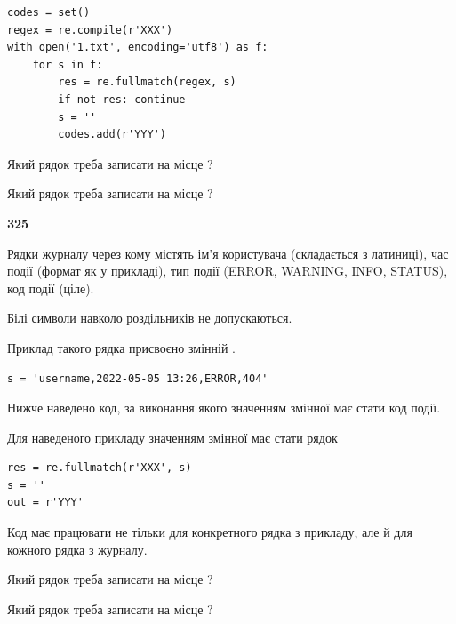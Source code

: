 \begin{verbatim}
codes = set()
regex = re.compile(r'XXX')
with open('1.txt', encoding='utf8') as f:
    for s in f:
        res = re.fullmatch(regex, s)
        if not res: continue
        s = ''
        codes.add(r'YYY')
\end{verbatim}







Який рядок треба записати на місце  ?\par
\vspace{5mm}


Який рядок треба записати на місце  ?\par


\newpage

{\begin {center}\textbf{ 325}\end {center}}\par
Рядки журналу через кому містять ім'я користувача (складається з латиниці), час події (фор\-мат як у прикладі), тип події (ERROR, WARNING, INFO, STATUS), код події (ціле).

Білі символи навколо роздільників не допускаються.

Приклад такого рядка присвоєно змінній .



\begin{verbatim}
s = 'username,2022-05-05 13:26,ERROR,404'
\end{verbatim}


Нижче наведено код, за виконання якого значенням змінної  має стати код події.

Для наведеного прикладу значенням змінної  має стати рядок 



\begin{verbatim}
res = re.fullmatch(r'XXX', s)
s = ''
out = r'YYY'
\end{verbatim}


Код має працювати не тільки для конкретного рядка з прикладу, але й для кожного рядка з журналу.




Який рядок треба записати на місце  ?\par
\vspace{5mm}


Який рядок треба записати на місце  ?\par


